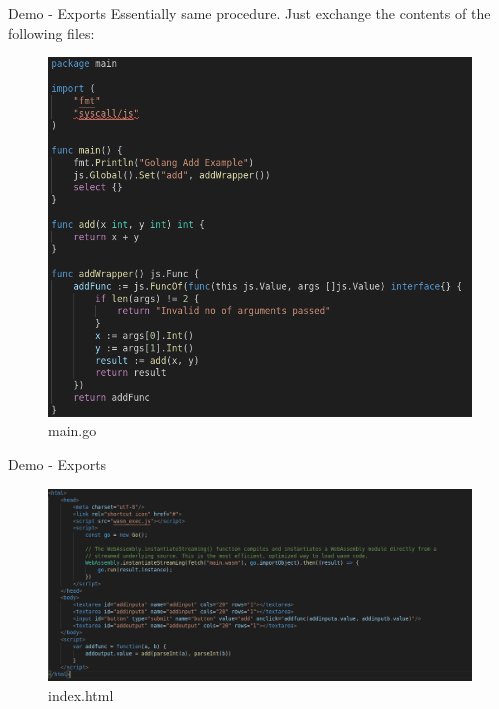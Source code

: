 \documentclass{beamer}
\begin{document}
\begin{frame}{Demo - Exports}
Essentially same procedure. Just exchange the contents of the following files: 
\begin{figure}
    \includegraphics[scale=0.2]{./images/main.png}
    \caption{main.go}
\end{figure}

\end{frame}

\begin{frame}{Demo - Exports}
\begin{figure}
    \includegraphics[scale=0.2]{./images/index.png}
    \caption{index.html}
\end{figure}

\end{frame}
\end{document}
